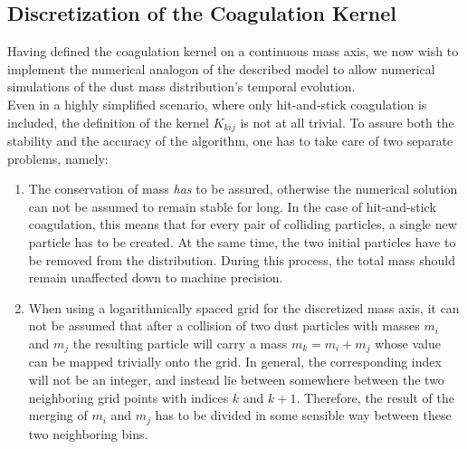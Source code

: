     \subsection{Discretization of the Coagulation Kernel}

        Having defined the coagulation kernel on a continuous mass axis,
        we now wish to implement the numerical analogon of the described model to allow 
        numerical simulations of the dust mass distribution's temporal evolution. \\

        Even in a highly simplified scenario, where only hit-and-stick coagulation is included, 
        the definition of the kernel $K_{kij}$ is not at all trivial. To assure both the 
        stability and the accuracy of the algorithm, one has to take care of two separate 
        problems, namely:
        \begin{enumerate}
            \item The conservation of mass \textit{has} to be assured, otherwise the numerical      
                solution can not be assumed to remain stable for long. In the case of hit-and-stick 
                coagulation, this means that for every pair of colliding particles, a single new 
                particle has to be created. At the same time, the two initial particles have to be 
                removed from the distribution. During this process, the total mass should remain 
                unaffected down to machine precision.
            \item When using a logarithmically spaced grid for the discretized mass axis, it can 
                not be assumed that after a collision of two dust particles with masses $m_i$ and 
                $m_j$ the resulting particle will carry a mass $m_k=m_i+m_j$ whose value can be 
                mapped trivially onto the grid. In general, the corresponding index will not be an 
                integer, and instead lie between somewhere between the two neighboring grid points 
                with indices $k$ and $k+1$.
                Therefore, the result of the merging of $m_i$ and $m_j$ has to be divided in some 
                sensible way between these two neighboring bins.
        \end{enumerate}


